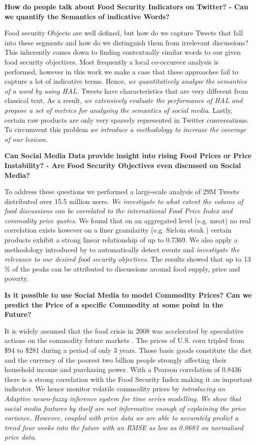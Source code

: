 \newpage 


\textbf{How do people talk about Food Security Indicators on Twitter? - Can we quantify the Semantics of indicative Words?} 

Food security Objects are well defined, but how do we capture Tweets that fall into these segments and how do we distinguish them from irrelevant discussions? This inherently comes down to finding contextually similar words to our given food security objectives. Most frequently a local co-occurece analysis is performed, however in this work we make a case that these approaches fail to capture a lot of indicative terms. Hence, \emph{we quantitatively analyse the semantics of a word by using HAL.} Tweets have characteristics that are very different from classical text. As a result, \emph{we extensively evaluate the performance of HAL and propose a set of metrics for analysing the semantics of social media}. Lastly, certain raw products are only very sparsely represented in Twitter conversations. To circumvent this problem \emph{ we introduce a methodology to increase the coverage of our lexicon.} 

\textbf{Can Social Media Data provide insight into rising Food Prices or Price Instability?  - Are Food Security Objectives even discussed on Social Media? }

To address these questions we performed a large-scale analysis of 29M Tweets distributed over 15.5 million users. \emph {We investigate to what extent the volume of food discussions can be correlated to the international Food Price Index and commodity price quotes}. We found that on an aggregated level (e.g. meat) no real correlation exists however on a finer granularity (e.g. Sirloin steak )  certain products exhibit a strong linear relationship of up to 0.7369. We also apply a methodology introduced by \cite{olt15} to automatically detect events and \emph{investigate the relevance to our desired food security objectives}. The results showed that up to 13 \% of the peaks can be attributed to discussions around food supply, price and poverty. 


\textbf{Is it possible to use Social Media to model Commodity Prices? Can we predict the Price of a specific Commodity at some point in the Future?}

It is widely assumed that  the food crisis in 2008 was accelerated by speculative actions on the commodity future markets \cite{foodwatch}. The prices of U.S. corn tripled from \$94 to \$281 during a period of only 3 years. Those basic goods constitute the diet and the currency of the poorest two billion people \cite{Tadesse2014} strongly affecting their household income and purchasing power. With a Pearson correlation of 0.8436 there is a strong correlation with the Food Security Index making it an important indicator. We hence monitor volatile commodity prices by \emph{ introducing an Adaptive neuro-fuzzy inference system for time series modelling}. \emph{We show that social media features by itself are not informative enough of explaining the price variance. However, coupled with price data we are able to accurately predict a trend four weeks into the future with an RMSE as low as 0.0683 on normalised price data}. 


